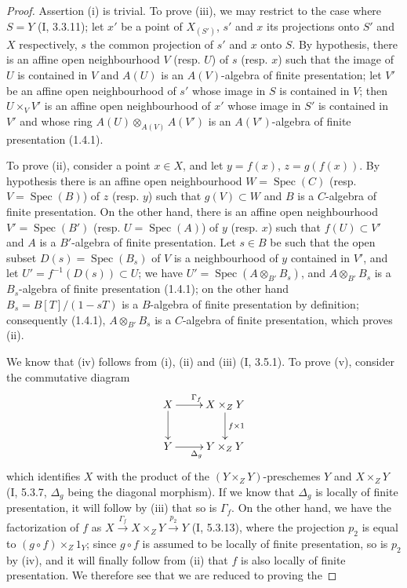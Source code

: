 \begin{proof}
Assertion (i) is trivial. To prove (iii), we may restrict to the case
where $S=Y$ (I, 3.3.11); let $x'$ be a point of $X_{(S')}$, $s'$ and $x$ its
projections onto $S'$ and $X$ respectively, $s$ the common projection of $s'$
and $x$ onto $S$. By hypothesis, there is an affine open neighbourhood $V$
(resp. $U$) of $s$ (resp. $x$) such that the image of $U$ is contained in $V$
and $A(U)$ is an $A(V)$-algebra of finite presentation; let $V'$ be an affine
open neighbourhood of $s'$ whose image in $S$ is contained in $V$; then
$U\times_VV'$ is an affine open neighbourhood of $x'$ whose image in $S'$
is contained in $V'$ and whose ring $A(U)\otimes_{A(V)}A(V')$ is an
$A(V')$-algebra of finite presentation (1.4.1).

To prove (ii), consider a point $x\in X$, and let $y=f(x)$,
$z=g(f(x))$. By hypothesis there is an affine open neighbourhood $W=\operatorname{Spec}(C)$
(resp. $V=\operatorname{Spec}(B)$) of $z$ (resp. $y$) such that $g(V)\subset W$ and $B$
is a $C$-algebra of finite presentation. On the other hand, there is an affine
open neighbourhood $V'=\operatorname{Spec}(B')$ (resp. $U=\operatorname{Spec}(A)$) of $y$ (resp. $x$) such that
$f(U)\subset V'$ and $A$ is a $B'$-algebra of finite presentation. Let
$s\in B$ be such that the open subset $D(s)=\operatorname{Spec}(B_s)$ of $V$ is a neighbourhood of $y$
contained in $V'$, and let $U'=f^{-1}(D(s))\subset U$; we have
$U'=\operatorname{Spec}(A\otimes_{B'}B_s)$, and $A\otimes_{B'}B_s$ is a $B_s$-algebra of
finite presentation (1.4.1); on the other hand $B_s=B[T]/(1-sT)$ is a
$B$-algebra of finite presentation by definition; consequently (1.4.1),
$A\otimes_{B'}B_s$ is a $C$-algebra of finite presentation, which proves
(ii).

We know that (iv) follows from (i), (ii) and (iii) (I, 3.5.1). To prove (v),
consider the commutative diagram
\[
\xymatrix{
X \ar[r]^{\Gamma_f} \ar[d] & X\times_ZY \ar[d]^{f\times 1} \\
Y \ar[r]_{\Delta_g} & Y\times_ZY
}
\]
which identifies $X$ with the product of the $(Y\times_ZY)$-preschemes $Y$ and
$X\times_ZY$ (I, 5.3.7, $\Delta_g$ being the diagonal morphism). If we know
that $\Delta_g$ is locally of finite presentation, it will follow by
(iii) that so is $\Gamma_f$. On the other hand, we have the factorization
of $f$ as
$X\xrightarrow{\Gamma_f}X\times_ZY\xrightarrow{p_2}Y$ (I, 5.3.13), where the
projection $p_2$ is equal to $(g\circ f)\times_Z1_Y$; since $g\circ f$ is
assumed to be locally of finite presentation, so is $p_2$ by
(iv), and it will finally follow from (ii) that $f$ is also locally of
finite presentation. We therefore see that we are reduced to proving the
\end{proof}

